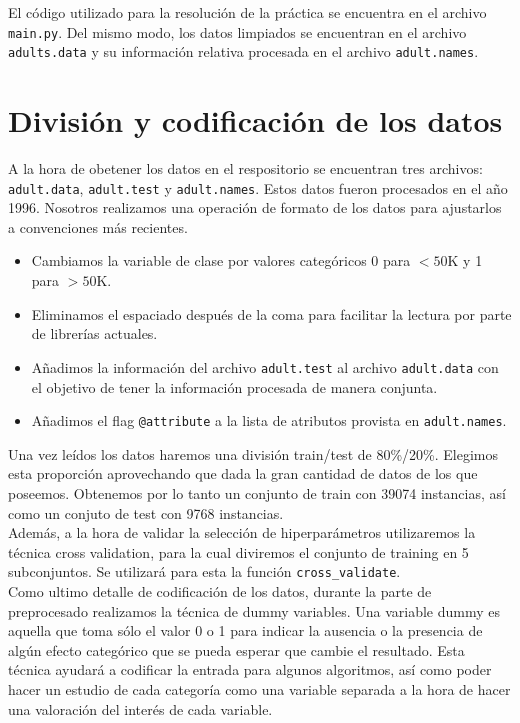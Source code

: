 \documentclass[11pt,a4paper]{article}
\begin{document}
El código utilizado para la resolución de la práctica se encuentra en el archivo \texttt{main.py}.  Del mismo modo, los datos limpiados se encuentran en el archivo \texttt{adults.data} y su información relativa procesada en el archivo \texttt{adult.names}.


\section{ División y codificación de los datos}

A la hora de obetener los datos en el respositorio se encuentran tres archivos: \texttt{adult.data},  \texttt{adult.test} y \texttt{adult.names}. Estos datos fueron procesados en el año 1996. Nosotros realizamos una operación de formato de los datos para ajustarlos a convenciones más recientes.

\begin{itemize}
\item Cambiamos la variable de clase por valores categóricos 0 para $<50$K y 1 para $>50$K.
\item Eliminamos el espaciado después de la coma para facilitar la lectura por parte de librerías actuales.
\item Añadimos la información del archivo \texttt{adult.test} al archivo \texttt{adult.data} con el objetivo de tener la información procesada de manera conjunta.
\item Añadimos el flag \texttt{@attribute} a la lista de atributos provista en \texttt{adult.names}.
\end{itemize}

Una vez leídos los datos haremos una división train/test de 80\%/20\%. Elegimos esta proporción aprovechando que dada la gran cantidad de datos de los que poseemos. Obtenemos por lo tanto un conjunto de train con 39074 instancias, así como un conjuto de test con 9768 instancias.\\

Además, a la hora de validar la selección de hiperparámetros utilizaremos la técnica cross validation, para la cual diviremos el conjunto de training en 5 subconjuntos. Se utilizará para esta la función \texttt{cross\_validate}\cite{cv}.\\

Como ultimo detalle de codificación de los datos, durante la parte de preprocesado realizamos la técnica de dummy variables. Una variable dummy es aquella que toma sólo el valor 0 o 1 para indicar la ausencia o la presencia de algún efecto categórico que se pueda esperar que cambie el resultado. Esta técnica ayudará a codificar la entrada para algunos algoritmos, así como poder hacer un estudio de cada categoría como una variable separada a la hora de hacer una valoración del interés de cada variable.
\end{document}
